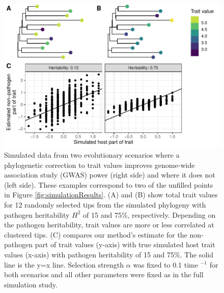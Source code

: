 \documentclass[11pt]{article}
\begin{document}
\begin{linenumbers}
\begin{figure}[H]
	\begin{center}
		\includegraphics[width=\linewidth]{fig3_Stadler_MBE-21-1179.pdf}
		\caption{Simulated data from two evolutionary scenarios where a phylogenetic correction to trait values improves genome-wide association study (GWAS) power (right side) and where it does not (left side). These examples correspond to two of the unfilled points in Figure \ref{fig:simulationResults}. (A) and (B) show total trait values for 12 randomly selected tips from the simulated phylogeny with pathogen heritability $H^2$ of 15 and 75\%, respectively. Depending on the pathogen heritability, trait values are more or less correlated at clustered tips. (C) compares our method's estimate for the non-pathogen part of trait values (y-axis) with true simulated host trait values (x-axis) with pathogen heritability of 15 and 75\%. The solid line is the y=x line. Selection strength $\alpha$ was fixed to 0.1 time $^{-1}$ for both scenarios and all other parameters were fixed as in the full simulation study.}
		\label{fig:simulationTraitExample}
	\end{center}
\end{figure}


\end{linenumbers}
\end{document}

